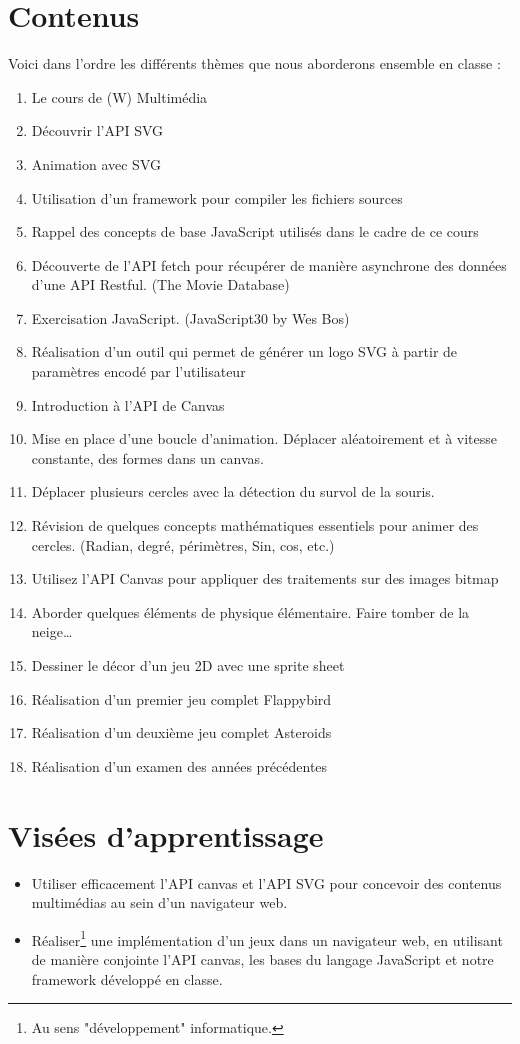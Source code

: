 \section{Contenus}
Voici dans l'ordre les différents thèmes que nous aborderons ensemble en classe :
\begin{enumerate}
    \item Le cours de (W) Multimédia
    \item Découvrir l’API SVG
    \item Animation avec SVG
    \item Utilisation d’un framework pour compiler les fichiers sources
    \item Rappel des concepts de base JavaScript utilisés dans le cadre de ce cours
    \item Découverte de l’API fetch pour récupérer de manière asynchrone des données d’une API Restful. (The Movie Database)
    \item Exercisation JavaScript. (JavaScript30 by Wes Bos)
    \item Réalisation d’un outil qui permet de générer un logo SVG à partir de paramètres encodé par l’utilisateur
    \item Introduction à l’API de Canvas
    \item Mise en place d’une boucle d’animation. Déplacer aléatoirement et à vitesse constante, des formes dans un canvas.
    \item Déplacer plusieurs cercles avec la détection du survol de la souris.
    \item Révision de quelques concepts mathématiques essentiels pour animer des cercles. (Radian, degré, périmètres, Sin, cos, etc.)
    \item Utilisez l’API Canvas pour appliquer des traitements sur des images bitmap
    \item Aborder quelques éléments de physique élémentaire. Faire tomber de la neige…
    \item Dessiner le décor d’un jeu 2D avec une sprite sheet
    \item Réalisation d’un premier jeu complet Flappybird
    \item Réalisation d’un deuxième jeu complet Asteroids
    \item Réalisation d’un examen des années précédentes
\end{enumerate}

\clearpage
\section{Visées d’apprentissage}
\begin{itemize}
    \item Utiliser efficacement l’API canvas et l’API SVG pour concevoir des contenus multimédias au sein d'un navigateur web.
    \item Réaliser\footnote{Au sens "développement" informatique.} une implémentation d’un jeux dans un navigateur web, en utilisant de manière conjointe l’API canvas, les bases du langage JavaScript et notre framework développé en classe.
\end{itemize}

